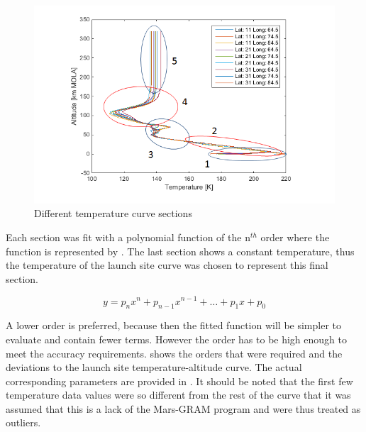 \begin{figure}[!ht]
\centering
\includegraphics[width=1.0\textwidth]{figures/software/temperatureDataSplit5.png}
\caption{Different temperature curve sections}
\label{fig:temperatureDataSplit5}
\end{figure}

Each section was fit with a polynomial function of the n$^{th}$ order where the function is represented by . The last section shows a constant temperature, thus the temperature of the launch site curve was chosen to represent this final section.

\begin{equation} \label{eq:polyGenFunct}
y=p_{n}x^{n}+p_{n-1}x^{n-1}+\dots+p_{1}x+p_{0}
\end{equation}

A lower order is preferred, because then the fitted function will be simpler to evaluate and contain fewer terms. However the order has to be high enough to meet the accuracy requirements.  shows the orders that were required and the deviations to the launch site temperature-altitude curve. The actual corresponding parameters are provided in . It should be noted that the first few temperature data values were so different from the rest of the curve that it was assumed that this is a lack of the Mars-\ac{GRAM} program and were thus treated as outliers.

